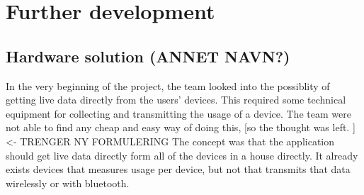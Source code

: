 \chapter{Further development}

\section{Hardware solution (ANNET NAVN?)}
In the very beginning of the project, the team looked into the possiblity of getting live data directly from the users' devices. This required some technical equipment for collecting and transmitting the usage of a device. The team were not able to find any cheap and easy way of doing this, [so the thought was left. ] <- TRENGER NY FORMULERING
The concept was that the application should get live data directly form all of the devices in a house directly. It already exists devices that measures usage per device, but not that transmits that data wirelessly or with bluetooth. 